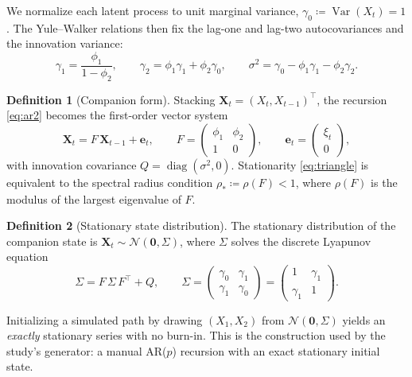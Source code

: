 \documentclass[11pt]{article}
\theoremstyle{definition}
\newtheorem{definition}{Definition}
\theoremstyle{remark}
\newcommand{\Var}{\operatorname{Var}}
\newcommand{\Norm}{\mathcal{N}}
\newcommand{\spradius}{\rho_{\!*}}
\begin{document}
We normalize each latent process to unit marginal variance,
$\gamma_0 \coloneqq \Var(X_t) = 1$. The Yule--Walker relations then fix
the lag-one and lag-two autocovariances and the innovation variance:
\begin{equation}
  \gamma_1 = \frac{\phi_1}{1-\phi_2},
  \qquad
  \gamma_2 = \phi_1\gamma_1 + \phi_2\gamma_0,
  \qquad
  \sigma^2 = \gamma_0 - \phi_1\gamma_1 - \phi_2\gamma_2.
  \label{eq:yw}
\end{equation}

\begin{definition}[Companion form]
\label{def:companion}
Stacking $\bm{X}_t = (X_t, X_{t-1})^\top$, the recursion
\eqref{eq:ar2} becomes the first-order vector system
\begin{equation}
  \bm{X}_t = F\,\bm{X}_{t-1} + \bm{e}_t,
  \qquad
  F = \begin{pmatrix} \phi_1 & \phi_2 \\ 1 & 0 \end{pmatrix},
  \qquad
  \bm{e}_t = \begin{pmatrix} \xi_t \\ 0 \end{pmatrix},
  \label{eq:companion}
\end{equation}
with innovation covariance $Q = \operatorname{diag}(\sigma^2, 0)$.
Stationarity \eqref{eq:triangle} is equivalent to the spectral radius
condition $\spradius \coloneqq \rho(F) < 1$, where $\rho(F)$ is the
modulus of the largest eigenvalue of $F$.
\end{definition}

\begin{definition}[Stationary state distribution]
\label{def:statedist}
The stationary distribution of the companion state is
$\bm{X}_t \sim \Norm(\bm{0}, \Sigma)$, where $\Sigma$ solves the
discrete Lyapunov equation
\begin{equation}
  \Sigma = F\,\Sigma\,F^\top + Q,
  \qquad
  \Sigma =
  \begin{pmatrix} \gamma_0 & \gamma_1 \\ \gamma_1 & \gamma_0 \end{pmatrix}
  =
  \begin{pmatrix} 1 & \gamma_1 \\ \gamma_1 & 1 \end{pmatrix}.
  \label{eq:lyapunov}
\end{equation}
\end{definition}

Initializing a simulated path by drawing $(X_1,X_2)$ from
$\Norm(\bm 0,\Sigma)$ yields an \emph{exactly} stationary series with no
burn-in. This is the construction used by the study's generator: a
manual AR($p$) recursion with an exact stationary initial state.
\end{document}
